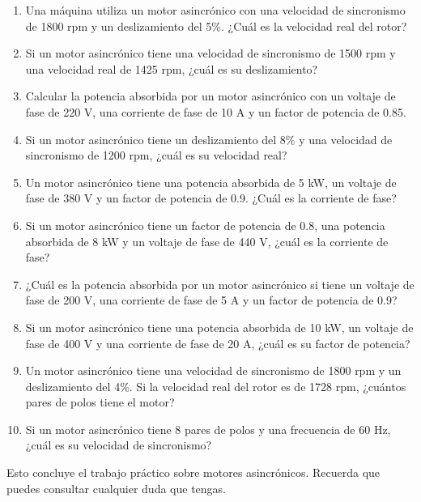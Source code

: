\documentclass[../main]{subfiles}
\begin{document}
\begin{enumerate}
    \item Una máquina utiliza un motor asincrónico con una velocidad de sincronismo de 1800 rpm y un deslizamiento del 5\%. ¿Cuál es la velocidad real del rotor?
    \item Si un motor asincrónico tiene una velocidad de sincronismo de 1500 rpm y una velocidad real de 1425 rpm, ¿cuál es su deslizamiento?
    \item Calcular la potencia absorbida por un motor asincrónico con un voltaje de fase de 220 V, una corriente de fase de 10 A y un factor de potencia de 0.85.
    \item Si un motor asincrónico tiene un deslizamiento del 8\% y una velocidad de sincronismo de 1200 rpm, ¿cuál es su velocidad real?
    \item Un motor asincrónico tiene una potencia absorbida de 5 kW, un voltaje de fase de 380 V y un factor de potencia de 0.9. ¿Cuál es la corriente de fase?
    \item Si un motor asincrónico tiene un factor de potencia de 0.8, una potencia absorbida de 8 kW y un voltaje de fase de 440 V, ¿cuál es la corriente de fase?
    \item ¿Cuál es la potencia absorbida por un motor asincrónico si tiene un voltaje de fase de 200 V, una corriente de fase de 5 A y un factor de potencia de 0.9?
    \item Si un motor asincrónico tiene una potencia absorbida de 10 kW, un voltaje de fase de 400 V y una corriente de fase de 20 A, ¿cuál es su factor de potencia?
    \item Un motor asincrónico tiene una velocidad de sincronismo de 1800 rpm y un deslizamiento del 4\%. Si la velocidad real del rotor es de 1728 rpm, ¿cuántos pares de polos tiene el motor?
    \item Si un motor asincrónico tiene 8 pares de polos y una frecuencia de 60 Hz, ¿cuál es su velocidad de sincronismo?
\end{enumerate}

Esto concluye el trabajo práctico sobre motores asincrónicos. Recuerda que puedes consultar cualquier duda que tengas.
\end{document}
